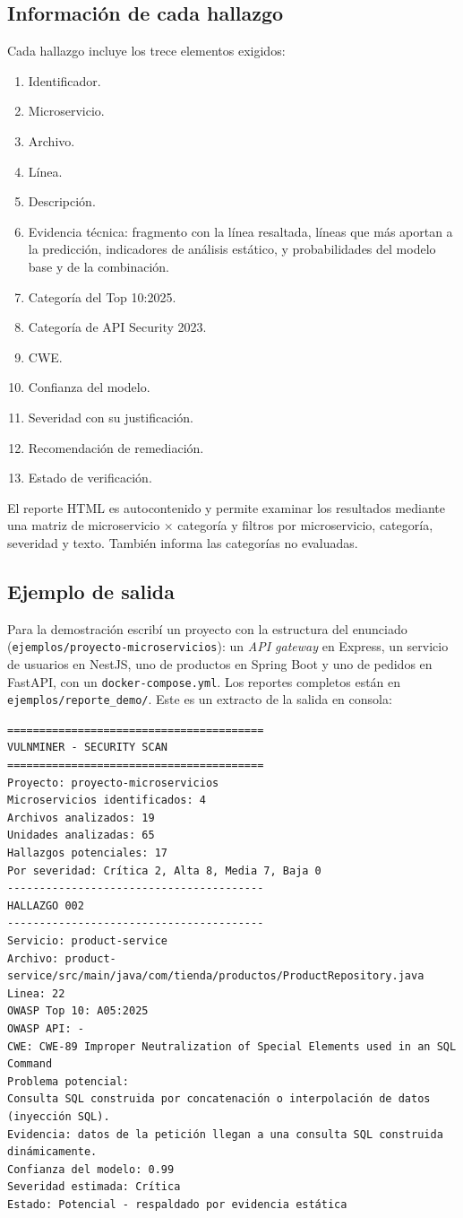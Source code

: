 \documentclass[12pt,a4paper]{article}
\newcommand{\ruta}[1]{\nolinkurl{#1}}
\newcommand{\cod}[1]{\texttt{#1}}
\begin{document}
\subsection{Información de cada hallazgo}
Cada hallazgo incluye los trece elementos exigidos:
\begin{enumerate}
  \item Identificador.
  \item Microservicio.
  \item Archivo.
  \item Línea.
  \item Descripción.
  \item Evidencia técnica: fragmento con la línea resaltada, líneas que más aportan a la predicción, indicadores de análisis estático, y probabilidades del modelo base y de la combinación.
  \item Categoría del Top 10:2025.
  \item Categoría de API Security 2023.
  \item CWE.
  \item Confianza del modelo.
  \item Severidad con su justificación.
  \item Recomendación de remediación.
  \item Estado de verificación.
\end{enumerate}
El reporte HTML es autocontenido y permite examinar los resultados mediante una matriz de microservicio \(\times\) categoría y filtros por microservicio, categoría, severidad y texto. También informa las categorías no evaluadas.

\subsection{Ejemplo de salida}
Para la demostración escribí un proyecto con la estructura del enunciado (\ruta{ejemplos/proyecto-microservicios}): un \emph{API gateway} en Express, un servicio de usuarios en NestJS, uno de productos en Spring Boot y uno de pedidos en FastAPI, con un \cod{docker-compose.yml}. Los reportes completos están en \ruta{ejemplos/reporte_demo/}. Este es un extracto de la salida en consola:

\begin{lstlisting}
========================================
VULNMINER - SECURITY SCAN
========================================
Proyecto: proyecto-microservicios
Microservicios identificados: 4
Archivos analizados: 19
Unidades analizadas: 65
Hallazgos potenciales: 17
Por severidad: Crítica 2, Alta 8, Media 7, Baja 0
----------------------------------------
HALLAZGO 002
----------------------------------------
Servicio: product-service
Archivo: product-service/src/main/java/com/tienda/productos/ProductRepository.java
Linea: 22
OWASP Top 10: A05:2025
OWASP API: -
CWE: CWE-89 Improper Neutralization of Special Elements used in an SQL Command
Problema potencial:
Consulta SQL construida por concatenación o interpolación de datos (inyección SQL).
Evidencia: datos de la petición llegan a una consulta SQL construida dinámicamente.
Confianza del modelo: 0.99
Severidad estimada: Crítica
Estado: Potencial - respaldado por evidencia estática
\end{lstlisting}
\end{document}
